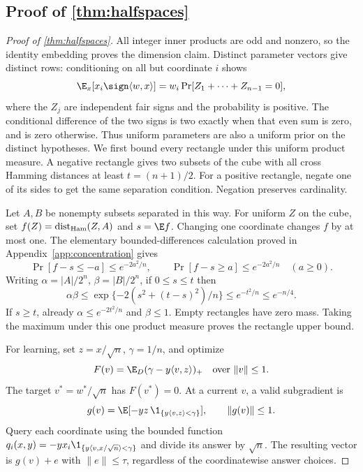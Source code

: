 \subsection[Proof of result halfspaces]{Proof of \cref{thm:halfspaces}}\label{proof:halfspaces}
\begin{proof}[Proof of \cref{thm:halfspaces}]
All integer inner products are odd and nonzero, so the identity embedding proves the dimension claim. Distinct parameter vectors give distinct rows: conditioning on all but coordinate $i$ shows
\[
 \E_x[x_i\sign\langle w,x\rangle]
 =w_i\Pr[Z_1+\cdots+Z_{n-1}=0],
\]
where the $Z_j$ are independent fair signs and the probability is positive. The conditional difference of the two signs is two exactly when that even sum is zero, and is zero otherwise. Thus uniform parameters are also a uniform prior on the distinct hypotheses. We first bound every rectangle under this uniform product measure. A negative rectangle gives two subsets of the cube with all cross Hamming distances at least $t=(n+1)/2$. For a positive rectangle, negate one of its sides to get the same separation condition. Negation preserves cardinality.

Let $A,B$ be nonempty subsets separated in this way. For uniform $Z$ on the cube, set $f(Z)=\operatorname{dist}_{\rm Ham}(Z,A)$ and $s=\E f$. Changing one coordinate changes $f$ by at most one. The elementary bounded-differences calculation proved in Appendix~\ref{app:concentration} gives
\[
 \Pr[f-s\le-a]\le e^{-2a^2/n},\qquad
 \Pr[f-s\ge a]\le e^{-2a^2/n}\quad(a\ge0).
\]
Writing $\alpha=|A|/2^n$, $\beta=|B|/2^n$, if $0\le s\le t$ then
\[
 \alpha\beta\le\exp\{-2(s^2+(t-s)^2)/n\}
 \le e^{-t^2/n}\le e^{-n/4}.
\]
If $s\ge t$, already $\alpha\le e^{-2t^2/n}$ and $\beta\le1$. Empty rectangles have zero mass. Taking the maximum under this one product measure proves the rectangle upper bound.

For learning, set $z=x/\sqrt n$, $\gamma=1/n$, and optimize
\[
 F(v)=\E_D(\gamma-y\langle v,z\rangle)_+
 \quad\text{over }\|v\|\le1.
\]
The target $v^*=w^*/\sqrt n$ has $F(v^*)=0$. At a current $v$, a valid subgradient is
\[
 g(v)=\E[-yz\,\1_{\{y\langle v,z\rangle<\gamma\}}],\qquad\|g(v)\|\le1.
\]
Query each coordinate using the bounded function
$q_i(x,y)=-yx_i\1_{\{y\langle v,x/\sqrt n\rangle<\gamma\}}$ and divide its answer by $\sqrt n$. The resulting vector is $g(v)+e$ with $\|e\|\le\tau$, regardless of the coordinatewise answer choices.


\end{proof}
